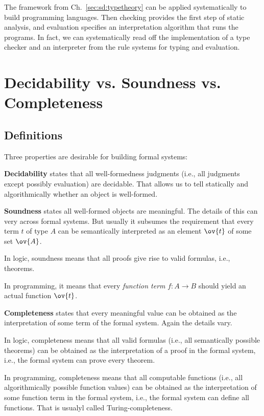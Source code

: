 The framework from Ch.~\ref{sec:sd:typetheory} can be applied systematically to build programming languages.
Then checking provides the first step of static analysis, and evaluation specifies an interpretation algorithm that runs the programs.
In fact, we can systematically read off the implementation of a type checker and an interpreter from the rule systems for typing and evaluation.

\section{Decidability vs. Soundness vs. Completeness}\label{sec:formsys:decsoucomp}

\subsection{Definitions}
Three properties are desirable for building formal systems:

\textbf{Decidability} states that all well-formedness judgments (i.e., all judgments except possibly evaluation) are decidable.
That allows us to tell statically and algorithmically whether an object is well-formed.

\textbf{Soundness} states all well-formed objects are meaningful.
The details of this can very across formal systems.
But usually it subsumes the requirement that every term $t$ of type $A$ can be semantically interpreted as an element $\ov{t}$ of some set $\ov{A}$.
\begin{compactitem}
 \item In logic, soundness means that all proofs give rise to valid formulas, i.e., theorems.
 \item In programming, it means that every \emph{function term} $f:A\to B$ should yield an actual function $\ov{t}$.
\end{compactitem}

\textbf{Completeness} states that every meaningful value can be obtained as the interpretation of some term of the formal system.
Again the details vary.
\begin{compactitem}
\item In logic, completeness means that all valid formulas (i.e., all semantically possible theorems) can be obtained as the interpretation of a proof in the formal system, i.e., the formal system can prove every theorem.
\item In programming, completeness means that all computable functions (i.e., all algorithmically possible function values) can be obtained as the interpretation of some function term in the formal system, i.e., the formal system can define all functions.
That is usualyl called Turing-completeness.
\end{compactitem}

